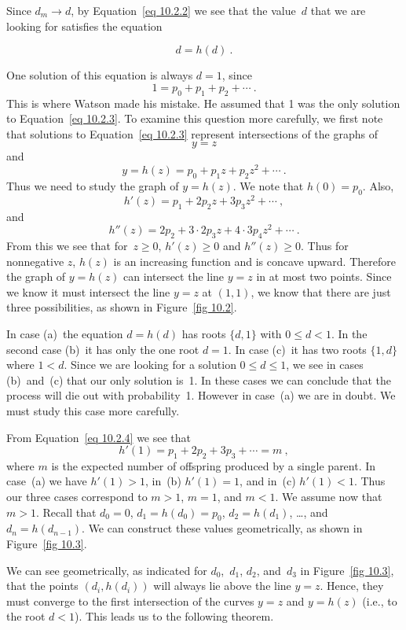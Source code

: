 \begin{example}
Since $d_m \to d$, by Equation~\ref{eq 10.2.2} we see that the value~$d$ that we are
looking for satisfies the equation

\begin{equation}
d = h(d)\ . 
\label{eq 10.2.3}
\end{equation}
 
One solution of this equation is always $d = 1$, since
$$
1 = p_0 + p_1 + p_2 +\cdots\ .
$$
This is where Watson made his mistake.  He assumed that 1 was the only solution
to Equation~\ref{eq 10.2.3}.  To examine this question more carefully, we first note
that solutions to Equation~\ref{eq 10.2.3} represent intersections of the graphs of
$$
y = z
$$
and
$$
y = h(z) = p_0 + p_1z + p_2z^2 +\cdots\ .
$$
Thus we need to study the graph of $y = h(z)$.
We note  that $h(0) = p_0$.  Also,
\begin{equation}
h'(z) = p_1 + 2p_2z + 3p_3z^2 +\cdots\ ,  \label{eq 10.2.4}
\end{equation}
and
$$
h''(z) = 2p_2 + 3 \cdot 2p_3z + 4 \cdot 3p_4z^2 + \cdots\ .
$$
From this we see that for~$z \geq 0$, $h'(z) \geq 0$ and $h''(z) \geq 0$.  Thus
for nonnegative $z$, $h(z)$ is an increasing function and is concave upward. 
Therefore the graph of $y = h(z)$ can intersect the line $y = z$ in at most two
points.  Since we know it must intersect the line $y = z$ at $(1,1)$, we know
that there are just three possibilities, as shown in Figure~\ref{fig 10.2}.
\par
In case (a)~the equation $d = h(d)$ has roots $\{d,1\}$ with $0 \leq d <
1$.  In the second case (b)~it has only the one root $d = 1$.  In case (c)~it
has two roots $\{1,d\}$ where $1 < d$.  Since we are looking for a solution $0
\leq d \leq 1$, we see in cases (b)~and~(c) that our only solution is~1.  In
these cases we can conclude that the process will die out with probability~1. 
However in case~(a) we are in doubt.  We must study this case more carefully.
\par
From Equation~\ref{eq 10.2.4} we see that
$$
h'(1) = p_1 + 2p_2 + 3p_3 +\cdots= m\ ,
$$
where $m$ is the expected number of offspring produced by a single parent.  In
case~(a) we have $h'(1) > 1$, in~(b) $h'(1) = 1$, and in~(c) $h'(1) < 1$.  Thus
our three cases correspond to $m > 1$, $m = 1$, and $m < 1$.  We assume now
that $m > 1$.  Recall that $d_0 = 0$, $d_1 = h(d_0) = p_0$, $d_2 = h(d_1)$,
\ldots, and $d_n = h(d_{n - 1})$.  We can construct these values geometrically,
as shown in Figure~\ref{fig 10.3}.
\par
We can see geometrically, as indicated for $d_0$,~$d_1$, $d_2$, and~$d_3$ in
Figure~\ref{fig 10.3}, that the points $(d_i,h(d_i))$ will always lie above the line $y =
z$.  Hence, they must converge to the first intersection of the curves $y = z$
and $y = h(z)$ (i.e., to the root $d < 1$).  This leads us to the following
theorem.
\end{example}
